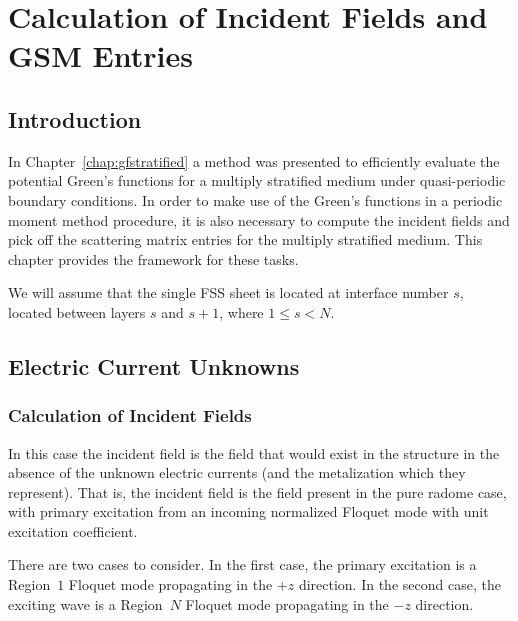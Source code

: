 \chapter{Calculation of Incident Fields and GSM Entries}
\label{chap:incgsm}

\section{Introduction}


In Chapter~\ref{chap:gfstratified} a method was presented to efficiently evaluate the
potential Green's functions for a multiply stratified medium under
quasi-periodic boundary conditions.  In order to make use of the
Green's functions in a periodic moment method procedure, it is also
necessary to compute the incident fields and pick off the scattering
matrix entries for the multiply stratified medium.  This chapter provides
the framework for these tasks.

We will assume that the single FSS sheet is located at interface
number $s$, located between layers $s$ and $s+1$, where $1 \leq s < N.$

\section{Electric Current Unknowns}
\subsection{Calculation of Incident Fields}
In this case the incident field is the field that would exist in the
 structure in the absence of the unknown electric currents (and the
 metalization which they represent). That is, the incident field is
 the field present in the pure radome case, with primary excitation
 from an incoming normalized Floquet mode with unit excitation
 coefficient.

 There are two cases to consider.  In the first case, the primary excitation
 is a Region~$1$ Floquet mode propagating in the $+z$ direction.  
 In the second case, the exciting wave is a Region~$N$ Floquet mode
 propagating in the  $-z$ direction.


